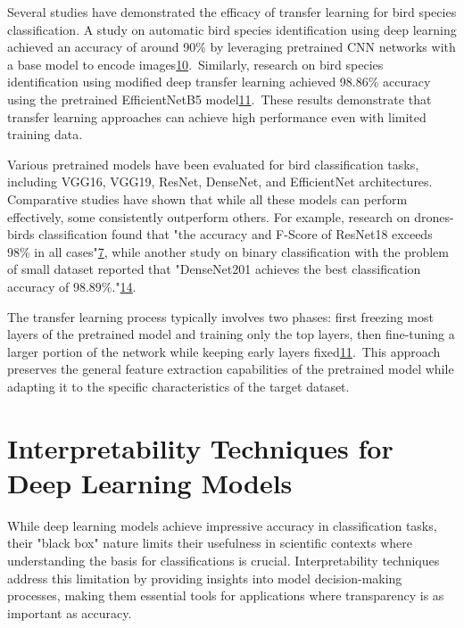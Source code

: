\documentclass[a4paper,12pt]{article}
\begin{document}
Several studies have demonstrated the efficacy of transfer learning for bird species classification. A study on automatic bird species identification using deep learning achieved an accuracy of around 90\% by leveraging pretrained CNN networks with a base model to encode images\href{https://www.semanticscholar.org/paper/41b0718279f408654094557156d4eeeb0067b2c4}{10}. Similarly, research on bird species identification using modified deep transfer learning achieved 98.86\% accuracy using the pretrained EfficientNetB5 model\href{https://www.semanticscholar.org/paper/770ee68d1b136cd098a018a399d1f69af29faae0}{11}. These results demonstrate that transfer learning approaches can achieve high performance even with limited training data.

Various pretrained models have been evaluated for bird classification tasks, including VGG16, VGG19, ResNet, DenseNet, and EfficientNet architectures. Comparative studies have shown that while all these models can perform effectively, some consistently outperform others. For example, research on drones-birds classification found that "the accuracy and F-Score of ResNet18 exceeds 98\% in all cases"\href{https://www.semanticscholar.org/paper/c16f57236555aae3f600ef8f1978eff10b410233}{7}, while another study on binary classification with the problem of small dataset reported that "DenseNet201 achieves the best classification accuracy of 98.89\%."\href{https://www.semanticscholar.org/paper/6529ad5f1094a8d9b0ab38db163c7fdaad2a1d9c}{14}.

The transfer learning process typically involves two phases: first freezing most layers of the pretrained model and training only the top layers, then fine-tuning a larger portion of the network while keeping early layers fixed\href{https://www.semanticscholar.org/paper/770ee68d1b136cd098a018a399d1f69af29faae0}{11}. This approach preserves the general feature extraction capabilities of the pretrained model while adapting it to the specific characteristics of the target dataset.

\section*{Interpretability Techniques for Deep Learning Models}
While deep learning models achieve impressive accuracy in classification tasks, their "black box" nature limits their usefulness in scientific contexts where understanding the basis for classifications is crucial. Interpretability techniques address this limitation by providing insights into model decision-making processes, making them essential tools for applications where transparency is as important as accuracy.
\end{document}
